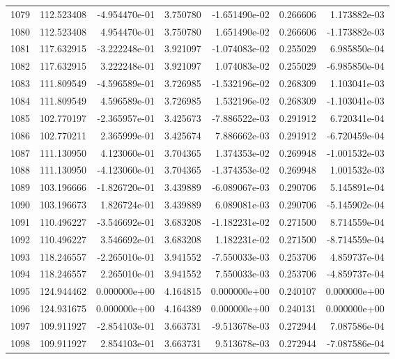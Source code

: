 \begin{tabular}{rrrrrrr}
1079 & 112.523408 & -4.954470e-01 &  3.750780 & -1.651490e-02 &    0.266606 &  1.173882e-03 \\
1080 & 112.523408 &  4.954470e-01 &  3.750780 &  1.651490e-02 &    0.266606 & -1.173882e-03 \\
1081 & 117.632915 & -3.222248e-01 &  3.921097 & -1.074083e-02 &    0.255029 &  6.985850e-04 \\
1082 & 117.632915 &  3.222248e-01 &  3.921097 &  1.074083e-02 &    0.255029 & -6.985850e-04 \\
1083 & 111.809549 & -4.596589e-01 &  3.726985 & -1.532196e-02 &    0.268309 &  1.103041e-03 \\
1084 & 111.809549 &  4.596589e-01 &  3.726985 &  1.532196e-02 &    0.268309 & -1.103041e-03 \\
1085 & 102.770197 & -2.365957e-01 &  3.425673 & -7.886522e-03 &    0.291912 &  6.720341e-04 \\
1086 & 102.770211 &  2.365999e-01 &  3.425674 &  7.886662e-03 &    0.291912 & -6.720459e-04 \\
1087 & 111.130950 &  4.123060e-01 &  3.704365 &  1.374353e-02 &    0.269948 & -1.001532e-03 \\
1088 & 111.130950 & -4.123060e-01 &  3.704365 & -1.374353e-02 &    0.269948 &  1.001532e-03 \\
1089 & 103.196666 & -1.826720e-01 &  3.439889 & -6.089067e-03 &    0.290706 &  5.145891e-04 \\
1090 & 103.196673 &  1.826724e-01 &  3.439889 &  6.089081e-03 &    0.290706 & -5.145902e-04 \\
1091 & 110.496227 & -3.546692e-01 &  3.683208 & -1.182231e-02 &    0.271500 &  8.714559e-04 \\
1092 & 110.496227 &  3.546692e-01 &  3.683208 &  1.182231e-02 &    0.271500 & -8.714559e-04 \\
1093 & 118.246557 & -2.265010e-01 &  3.941552 & -7.550033e-03 &    0.253706 &  4.859737e-04 \\
1094 & 118.246557 &  2.265010e-01 &  3.941552 &  7.550033e-03 &    0.253706 & -4.859737e-04 \\
1095 & 124.944462 &  0.000000e+00 &  4.164815 &  0.000000e+00 &    0.240107 &  0.000000e+00 \\
1096 & 124.931675 &  0.000000e+00 &  4.164389 &  0.000000e+00 &    0.240131 &  0.000000e+00 \\
1097 & 109.911927 & -2.854103e-01 &  3.663731 & -9.513678e-03 &    0.272944 &  7.087586e-04 \\
1098 & 109.911927 &  2.854103e-01 &  3.663731 &  9.513678e-03 &    0.272944 & -7.087586e-04 \\

\end{tabular}
